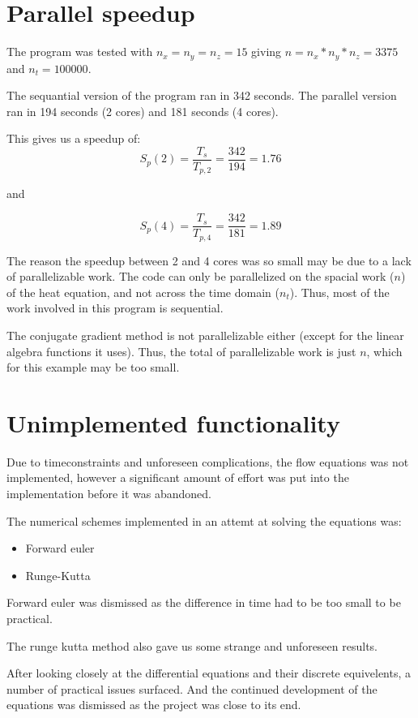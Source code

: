 \section{Parallel speedup}

The program was tested with $n_x=n_y=n_z=15$ giving $n=n_x*n_y*n_z=3375$ and $n_t=100000$.

The sequantial version of the program ran in 342 seconds. 
The parallel version ran in 194 seconds (2 cores) and 181 seconds (4 cores).

This gives us a speedup of:
\begin{equation}
S_p(2) = \frac{T_s}{T_{p,2}} = \frac{342}{194} = 1.76
\end{equation}

and

\begin{equation}
S_p(4) = \frac{T_s}{T_{p,4}} = \frac{342}{181} = 1.89
\end{equation}

The reason the speedup between 2 and 4 cores was so small may be due to a lack of
parallelizable work. The code can only be parallelized on the spacial work ($n$) of the
heat equation, and not across the time domain ($n_t$). Thus, most of the work involved in
this program is sequential.

The conjugate gradient method is not parallelizable either (except for the linear algebra functions it
uses). Thus, the total of parallelizable work is just $n$, which for this example may be too small.

\section{Unimplemented functionality}

Due to timeconstraints and unforeseen complications, the flow equations was not implemented, 
however a significant amount of effort was put into the implementation before it was 
abandoned.

The numerical schemes implemented in an attemt at solving the equations was:

\begin{itemize}
  \item Forward euler
  \item Runge-Kutta
\end{itemize} 

Forward euler was dismissed as the difference in time had to be too small to be practical.

The runge kutta method also gave us some strange and unforeseen results.

After looking closely at the differential equations and their discrete equivelents, a number
of practical issues surfaced. And the continued development of the equations was dismissed
as the project was close to its end.


